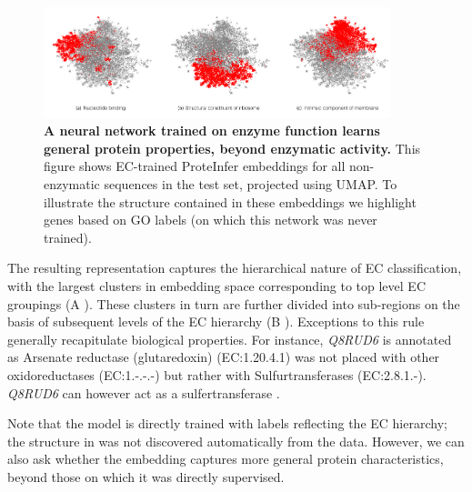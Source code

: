 \begin{figure}[t!]
    \centering
    \includegraphics[width=0.9\textwidth]{combined_subfigs_a.pdf}
    \caption{\textbf{A neural network trained on enzyme function learns general protein properties, beyond enzymatic activity.} This figure shows EC-trained ProteInfer embeddings for all non-enzymatic sequences in the test set, projected using UMAP. To illustrate the structure contained in these embeddings we highlight genes based on GO labels (on which this network was never trained).}\label{fig:unsupervised_embedding}
\end{figure}
The resulting representation captures the hierarchical nature of EC classification, with the largest clusters in embedding space corresponding to top level EC groupings (A%
). These clusters in turn are further divided into sub-regions on the basis of subsequent levels of the EC hierarchy (B%
). Exceptions to this rule generally recapitulate biological properties. For instance, \emph{Q8RUD6} is annotated as Arsenate reductase (glutaredoxin) (EC:1.20.4.1) \cite{pmid25464340} was not placed with other oxidoreductases (EC:1.-.-.-) but rather with Sulfurtransferases (EC:2.8.1.-). \emph{Q8RUD6} can however act as a sulfertransferase \cite{pmid17408957}. 


Note that the model is directly trained with labels reflecting the EC hierarchy; the structure in  %
 was not discovered automatically from the data. However, we can also ask whether the embedding captures more general protein characteristics, beyond those on which it was directly supervised.


